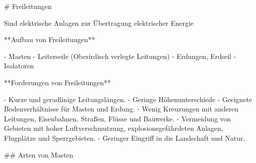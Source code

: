 \begin{markdown}

# Freileitungen

Sind elektrische Anlagen zur Übertragung elektrischer Energie


**Aufbau von Freileitungen**

- Masten
- Leiterseile (Oberirdisch verlegte Leitungen)
- Erdungen, Erdseil
- Isolatoren

**Forderungen von Freileitungen**

- Kurze und geradlinige Leitungslängen.
- Geringe Höhenunterschiede
- Geeignete Bodenverhältnisse für Masten und Erdung.
- Wenig Kreuzungen mit anderen Leitungen, Eisenbahnen, Straßen, Flüsse und Bauwerke.
- Vermeidung von Gebieten mit hoher Luftverschmutzung, explosionsgefährdeten Anlagen, Flugplätze und Sperrgebieten.
- Geringer Eingriff in die Landschaft und Natur.

## Arten von Masten

\end{markdown}

